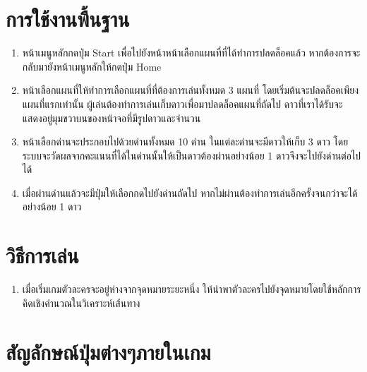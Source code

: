 \section{การใช้งานพื้นฐาน}
\begin{enumerate}
    \item หน้าเมนูหลักกดปุ่ม Start เพื่อไปยังหน้าหน้าเลือกแผนที่ที่ได้ทำการปลดล็อคแล้ว หากต้องการจะกลับมายังหน้าเมนูหลักให้กดปุ่ม Home
    \item หน้าเลือกแผนที่ให้ทำการเลือกแผนที่ที่ต้องการเล่นทั้งหมด 3 แผนที่ โดยเริ่มต้นจะปลดล็อคเพียงแผนที่แรกเท่านั้น ผู้เล่นต้องทำการเล่นเก็บดาวเพื่อมาปลดล็อคแผนที่ถัดไป ดาวที่เราได้รับจะแสดงอยู่มุมขวาบนของหน้าจอที่มีรูปดาวและจำนวน
    \item หน้าเลือกด่านจะประกอบไปด้วยด่านทั้งหมด 10 ด่าน ในแต่ละด่านจะมีดาวให้เก็บ 3 ดาว โดยระบบจะวัดผลจากคะแนนที่ได้ในด่านนั้นให้เป็นดาวต้องผ่านอย่างน้อย 1 ดาวจึงจะไปยังด่านต่อไปได้
    \item เมื่อผ่านด่านแล้วจะมีปุ่มให้เลือกกดไปยังด่านถัดไป หากไม่ผ่านต้องทำการเล่นอีกครั้งจนกว่าจะได้อย่างน้อย 1 ดาว
\end{enumerate}

\section{วิธีการเล่น}
\begin{enumerate}
    \item เมื่อเริ่มเกมตัวละครจะอยู่ห่างจากจุดหมายระยะหนึ่ง ให้นำพาตัวละครไปยังจุดหมายโดยใช้หลักการคิดเชิงคำนวณในวิเคราะห์เส้นทาง 
    
\end{enumerate}

\section{สัญลักษณ์ปุ่มต่างๆภายในเกม}

